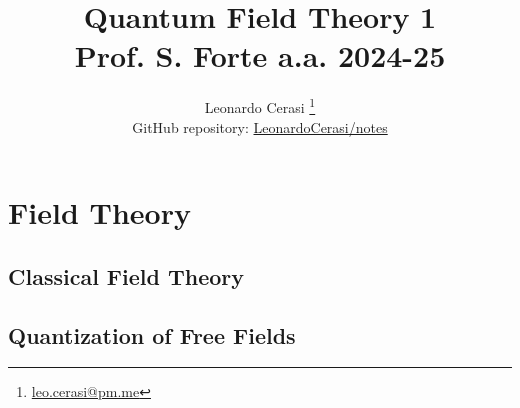 \documentclass[a4paper, 12pt, openany]{book}
\title{\Huge\textbf{Quantum Field Theory 1} \\ \large Prof. S. Forte a.a. 2024-25}
\author{Leonardo Cerasi%
	\thanks{\scriptsize\href{mailto:leonardo.cerasi@studenti.unimi.it}{leo.cerasi@pm.me}}\\
	\small GitHub repository: \href{https://github.com/LeonardoCerasi/notes}{LeonardoCerasi/notes}}
\begin{document}
\frontmatter

\maketitle
\tableofcontents
\pagestyle{indice}

\mainmatter

\part{Field Theory}
\pagestyle{body}

\chapter{Classical Field Theory}


\chapter{Quantization of Free Fields}

\end{document}
